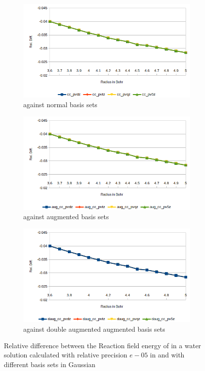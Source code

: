 \documentclass[../Thesis.tex]{subfiles}
\begin{document}
\begin{figure}[h!]
  \centering
  \begin{subfigure}[b]{0.75\linewidth}
    \includegraphics[width=\linewidth]{img/lipreldiff.png}
    \caption{\mrchem against normal basis sets}
  \end{subfigure}
  \begin{subfigure}[b]{0.75\linewidth}
    \includegraphics[width=\linewidth]{img/lipaugreldiff.png}
    \caption{\mrchem against augmented basis sets}
  \end{subfigure}
  \begin{subfigure}[b]{0.75\linewidth}
    \includegraphics[width=\linewidth]{img/lipdaugreldiff.png}
    \caption{\mrchem against double augmented augmented basis sets}
  \end{subfigure}
  \caption[Relative difference between methods for ]{Relative difference between the Reaction field energy of in a water solution calculated with relative precision $e-05$ in \mrchem
  and with different basis sets in Gaussian}
  \label{fig:lipreldiff}
\end{figure}
\end{document}

